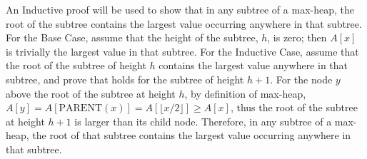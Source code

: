 An Inductive proof will be used to show that in any subtree of a max-heap, the root of the subtree contains the largest value occurring anywhere in that subtree. For the Base Case, assume that the height of the subtree, $h$, is zero; then $A[x]$ is trivially the largest value in that subtree. For the Inductive Case, assume that the root of the subtree of height $h$ contains the largest value anywhere in that subtree, and prove that holds for the subtree of height $h + 1$. For the node $y$ above the root of the subtree at height $h$, by definition of max-heap, $A[y] = A[\text{PARENT}(x)] = A[\lfloor x / 2 \rfloor] \geq A[x]$, thus the root of the subtree at height $h + 1$ is larger than its child node. Therefore, in any subtree of a max-heap, the root of that subtree contains the largest value occurring anywhere in that subtree.
